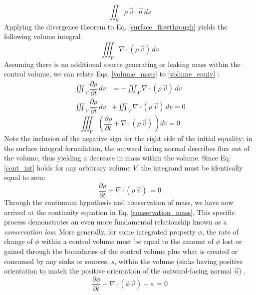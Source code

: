 \begin{equation} \label{surface_flowthrough}
\iint_S \rho \, \vec{v}\cdot \vec{n} \, ds
\end{equation}
Applying the divergence theorem to Eq. \ref{surface_flowthrough} yields the following volume integral
\begin{equation} \label{volume_equiv}
\iiint_V \nabla \cdot \left(\rho \, \vec{v} \right) \, dv
\end{equation}
Assuming there is no additional source generating or leaking mass within the control volume, we can relate Eqs. \ref{volume_mass} to \ref{volume_equiv} : 
\begin{equation*}
\begin{aligned}
\iiint_{V} \dfrac{\partial \rho}{\partial t}\,dv &= - \iiint_V \nabla \cdot \left(\rho \, \vec{v} \right) \, dv \\ 
\iiint_{V} \dfrac{\partial \rho}{\partial t}\,dv &+ \iiint_V \nabla \cdot \left(\rho \, \vec{v} \right) \, dv  = 0 
\end{aligned}
\end{equation*}
\begin{equation} \label{cont_int}
\iiint_{V} \left( \dfrac{\partial \rho}{\partial t} + \nabla \cdot \left(\rho \, \vec{v} \right) \,\right) dv  = 0
\end{equation}
Note the inclusion of the negative sign for the right side of the initial equality; in the surface integral formulation, the outward facing normal describes flux out of the volume, thus yielding a decrease in mass within the volume. Since Eq. \ref{cont_int} holds for any arbitrary volume $V$, the integrand must be identically equal to zero:
\begin{equation} \label{conservation_mass}
\dfrac{\partial \rho}{\partial t} +  \nabla \cdot \left(\rho \, \vec{v} \right) \,  = 0
\end{equation}
Through the continuum hypothesis and conservation of mass, we have now arrived at the continuity equation in Eq. \ref{conservation_mass}. This specific process demonstrates an even more fundamental relationship known as a \textit{conservation law}. More generally, for some integrated property $\phi$, the rate of change of $\phi$ within a control volume must be equal to the amount of $\phi$ lost or gained through the boundaries of the control volume plus what is created or consumed by any sinks or sources, $s$, within the volume (sinks having positive orientation to match the positive orientation of the outward-facing normal $\vec{n}$) \cite{}. 
\begin{equation} \label{conservation_law}
\dfrac{\partial \phi}{\partial t} +  \nabla \cdot \left(\phi \, \vec{v} \right) + s \,  = 0
\end{equation}
